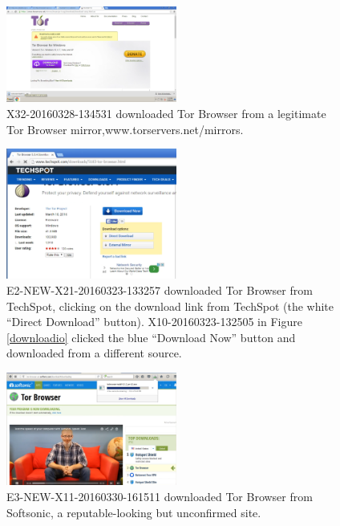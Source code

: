 \documentclass[USenglish,oneside,twocolumn]{article}
\begin{document}
\begin{figure}[h]
\label{mirror}
\includegraphics[width=0.5\textwidth]{../experiment/processing/bad-participants/X32-20160328-134531-mirror.png}
\caption{X32-20160328-134531 downloaded Tor Browser from a legitimate Tor Browser mirror,www.torservers.net/mirrors.}
\end{figure}

\begin{figure}[h]
\label{techspot}
\includegraphics[width=0.5\textwidth]{../experiment/processing/bad-participants/20160323-133257-techspot.png}
\caption{E2-NEW-X21-20160323-133257 downloaded Tor Browser from TechSpot, clicking on the download link from 
TechSpot (the white ``Direct Download'' button). X10-20160323-132505 in Figure \ref{downloadio} clicked the blue ``Download Now'' button and downloaded from a different source.}
\end{figure}

\begin{figure}[h]
\label{softsonic}
\includegraphics[width=0.5\textwidth]{../experiment/processing/bad-participants/20160330-161511-softsonic.png}
\caption{E3-NEW-X11-20160330-161511 downloaded Tor Browser from Softsonic, a reputable-looking but
unconfirmed site.}
\end{figure}
\end{document}
